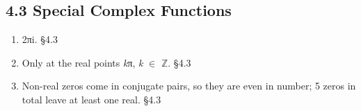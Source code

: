 \documentclass[11pt]{article}
\begin{document}
\begin{keepsection}\subsection{4.3 Special Complex Functions}

\begin{enumerate}
\item 2πi. \hfill{\small\color{FAUblue}§4.3}
\item Only at the real points \textit{k}π, \textit{k} \ensuremath{\in} \ensuremath{\mathbb{Z}}. \hfill{\small\color{FAUblue}§4.3}
\item Non-real zeros come in conjugate pairs, so they are even in number; 5 zeros in total leave at least one real. \hfill{\small\color{FAUblue}§4.3}
\end{enumerate}

\end{keepsection}
\end{document}
